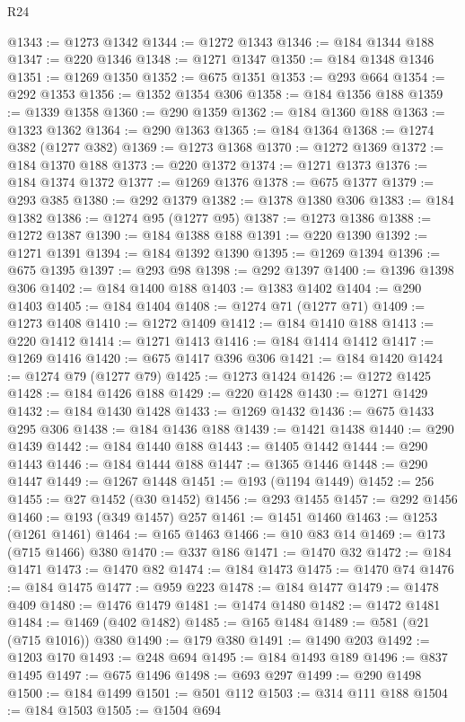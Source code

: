 \begin{lexlean}{R24}
\begin{coremodule}
@1343 := @1273 @1342
@1344 := @1272 @1343
@1346 := @184 @1344 @188
@1347 := @220 @1346
@1348 := @1271 @1347
@1350 := @184 @1348 @1346
@1351 := @1269 @1350
@1352 := @675 @1351
@1353 := @293 @664
@1354 := @292 @1353
@1356 := @1352 @1354 @306
@1358 := @184 @1356 @188
@1359 := @1339 @1358
@1360 := @290 @1359
@1362 := @184 @1360 @188
@1363 := @1323 @1362
@1364 := @290 @1363
@1365 := @184 @1364
@1368 := @1274 @382 (@1277 @382)
@1369 := @1273 @1368
@1370 := @1272 @1369
@1372 := @184 @1370 @188
@1373 := @220 @1372
@1374 := @1271 @1373
@1376 := @184 @1374 @1372
@1377 := @1269 @1376
@1378 := @675 @1377
@1379 := @293 @385
@1380 := @292 @1379
@1382 := @1378 @1380 @306
@1383 := @184 @1382
@1386 := @1274 @95 (@1277 @95)
@1387 := @1273 @1386
@1388 := @1272 @1387
@1390 := @184 @1388 @188
@1391 := @220 @1390
@1392 := @1271 @1391
@1394 := @184 @1392 @1390
@1395 := @1269 @1394
@1396 := @675 @1395
@1397 := @293 @98
@1398 := @292 @1397
@1400 := @1396 @1398 @306
@1402 := @184 @1400 @188
@1403 := @1383 @1402
@1404 := @290 @1403
@1405 := @184 @1404
@1408 := @1274 @71 (@1277 @71)
@1409 := @1273 @1408
@1410 := @1272 @1409
@1412 := @184 @1410 @188
@1413 := @220 @1412
@1414 := @1271 @1413
@1416 := @184 @1414 @1412
@1417 := @1269 @1416
@1420 := @675 @1417 @396 @306
@1421 := @184 @1420
@1424 := @1274 @79 (@1277 @79)
@1425 := @1273 @1424
@1426 := @1272 @1425
@1428 := @184 @1426 @188
@1429 := @220 @1428
@1430 := @1271 @1429
@1432 := @184 @1430 @1428
@1433 := @1269 @1432
@1436 := @675 @1433 @295 @306
@1438 := @184 @1436 @188
@1439 := @1421 @1438
@1440 := @290 @1439
@1442 := @184 @1440 @188
@1443 := @1405 @1442
@1444 := @290 @1443
@1446 := @184 @1444 @188
@1447 := @1365 @1446
@1448 := @290 @1447
@1449 := @1267 @1448
@1451 := @193 (@1194 @1449)
@1452 := 256
@1455 := @27 @1452 (@30 @1452)
@1456 := @293 @1455
@1457 := @292 @1456
@1460 := @193 (@349 @1457) @257
@1461 := @1451 @1460
@1463 := @1253 (@1261 @1461)
@1464 := @165 @1463
@1466 := @10 @83 @14
@1469 := @173 (@715 @1466) @380
@1470 := @337 @186
@1471 := @1470 @32
@1472 := @184 @1471
@1473 := @1470 @82
@1474 := @184 @1473
@1475 := @1470 @74
@1476 := @184 @1475
@1477 := @959 @223
@1478 := @184 @1477
@1479 := @1478 @409
@1480 := @1476 @1479
@1481 := @1474 @1480
@1482 := @1472 @1481
@1484 := @1469 (@402 @1482)
@1485 := @165 @1484
@1489 := @581 (@21 (@715 @1016)) @380
@1490 := @179 @380
@1491 := @1490 @203
@1492 := @1203 @170
@1493 := @248 @694
@1495 := @184 @1493 @189
@1496 := @837 @1495
@1497 := @675 @1496
@1498 := @693 @297
@1499 := @290 @1498
@1500 := @184 @1499
@1501 := @501 @112
@1503 := @314 @111 @188
@1504 := @184 @1503
@1505 := @1504 @694

\end{coremodule}
\end{lexlean}
